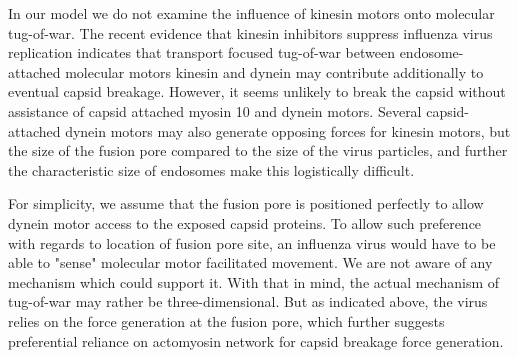 In our model we do not examine the influence of kinesin motors onto molecular tug-of-war. The recent evidence that kinesin inhibitors suppress influenza virus replication \cite{cho2020selective, kim2021kif11} indicates that transport focused tug-of-war between endosome-attached molecular motors kinesin and dynein may contribute additionally to eventual capsid breakage. However, it seems unlikely to break the capsid  without assistance of capsid attached myosin 10 and dynein motors. Several capsid-attached dynein motors may also generate opposing forces for kinesin motors, but the size of the fusion pore \cite{lee2010architecture} compared to the size of the virus particles, and further the characteristic size of endosomes \cite{ganley2004rab9} make this logistically difficult.

For simplicity, we assume that the fusion pore is positioned perfectly to allow dynein motor access to the exposed capsid proteins. To allow such preference with regards to location of fusion pore site, an influenza virus would have to be able to "sense" molecular motor facilitated movement. We are not aware of any mechanism which could support it. With that in mind, the actual mechanism of tug-of-war may rather be three-dimensional. But as indicated above, the virus relies on the force generation at the fusion pore, which further suggests preferential reliance on actomyosin network for capsid breakage force generation.